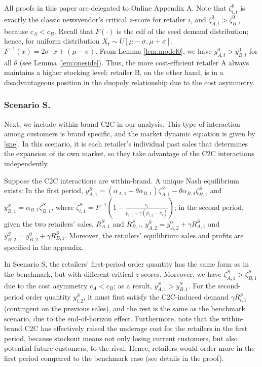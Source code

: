 \documentclass[nonblindrev,copyedit]{informs1}
\begin{document}
All proofs in this paper are delegated to Online Appendix A. Note that $\zeta_{i,t}^0$ is exactly the classic newsvendor's critical $z$-score for retailer $i$, and $\zeta_{A,t}^0>\zeta_{B,t}^0$ because $c_A < c_B$. Recall that $F(\cdot)$ is the cdf of the seed demand distribution; hence, for uniform distribution $X_t\sim U[\mu-\sigma,\mu+\sigma]$, $F^{-1}(x)=2\sigma\cdot x+(\mu-\sigma)$. From Lemma \ref{lem:model0}, we have $y^{0}_{A,t} > y^{0}_{B,t}$ for all $\theta$ (see Lemma \ref{lem:oneside}). Thus, the more cost-efficient retailer A always maintains a higher stocking level; retailer B, on the other hand, is in a disadvantageous position in the duopoly relationship due to the cost asymmetry.

\subsubsection{Scenario S.}
Next, we include within-brand C2C in our analysis. This type of interaction among customers is brand specific, and the market dynamic equation is given by \eqref{sne}. In this scenario, it is each retailer's individual past sales that determines the expansion of its own market, so they take advantage of the C2C interactions independently.
\begin{lemma}
\label{lem:models}
Suppose the C2C interactions are within-brand. A unique Nash equilibrium exists: In the first period, $y^{S}_{A,1} = (\alpha_{A,1} + \theta \alpha_{B,1}) \zeta_{A,1}^S - \theta \alpha_{B,1} \zeta_{B,1}^S$ and $y^{S}_{B,1} = \alpha_{B,1} \zeta_{B,1}^S$, where $\zeta^S_{i,1} = F^{-1}\left( 1 - \frac{c_i}{p_{i,1} + \gamma (p_{i,2}-c_i)}\right)$; in the second period, given the two retailers' sales, $R_{A,1}^S$ and $R_{B,1}^S$, $y^{S}_{A,2} = y_{A,2}^0 + \gamma R_{A,1}^S$ and $y^{S}_{B,2} = y_{B,2}^0 +  \gamma R_{B,1}^S$. Moreover, the retailers' equilibrium sales and profits are specified in the appendix.
\end{lemma}

In Scenario S, the retailers' first-period order quantity has the same form as in the benchmark, but with different critical $z$-scores. Moreover, we have $\zeta_{A,1}^S > \zeta_{B,1}^S$ due to the cost asymmetry $c_A < c_B$; as a result, $y^{S}_{A,1} > y^{S}_{B,1}$. For the second-period order quantity $y_{i,2}^S$, it must first satisfy the C2C-induced demand $\gamma R_{i,1}^S$ (contingent on the previous sales), and the rest is the same as the benchmark scenario, due to the end-of-horizon effect. Furthermore, note that the within-brand C2C has effectively raised the underage cost for the retailers in the first period, because stockout means not only losing current customers, but also potential future customers, to the rival. Hence, retailers would order more in the first period compared to the benchmark case (see details in the proof).
\end{document}
